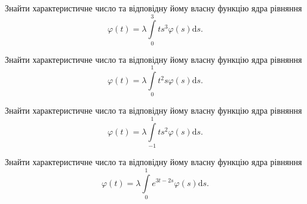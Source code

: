 \documentclass[12pt]{extarticle}
\begin{document}
\begin{Exercise}
Знайти характеристичне число та відповідну йому власну функцію ядра рівняння \[\varphi(t) = \lambda\int\limits_{0}^{3} t s^3\varphi(s) \mathrm{d}s.\]
\end{Exercise}

\begin{Exercise}
Знайти характеристичне число та відповідну йому власну функцію ядра рівняння \[\varphi(t) = \lambda\int\limits_{0}^{1} t^2 s \varphi(s) \mathrm{d}s.\]
\end{Exercise}

\begin{Exercise}
Знайти характеристичне число та відповідну йому власну функцію ядра рівняння \[\varphi(t) = \lambda\int\limits_{-1}^{1} t s^2 \varphi(s) \mathrm{d}s.\]
\end{Exercise}

\begin{Exercise}
Знайти характеристичне число та відповідну йому власну функцію ядра рівняння \[\varphi(t) = \lambda\int\limits_{0}^{1} e^{3t-2s} \varphi(s) \mathrm{d}s.\]
\end{Exercise}
\end{document}
